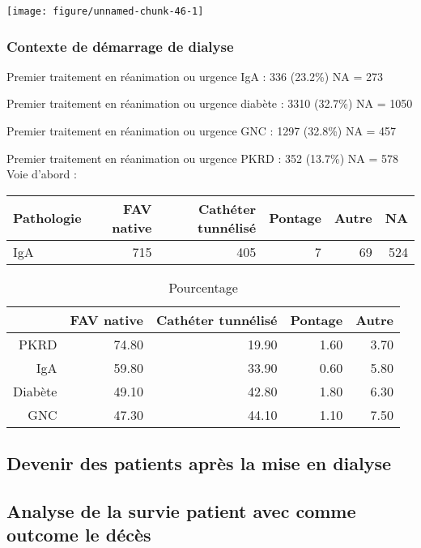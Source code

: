 \documentclass[11pt,a4paper]{article}\usepackage[]{graphicx}\usepackage[]{color}
\makeatletter
\def\maxwidth{ %
  \ifdim\Gin@nat@width>\linewidth
    \linewidth
  \else
    \Gin@nat@width
  \fi
}
\makeatother
\begin{document}
\texttt{[image: figure/unnamed-chunk-46-1]} 


    \subsubsection{Contexte de démarrage de dialyse}



    
Premier traitement en réanimation ou urgence IgA :  336 (23.2\%) NA = 273

Premier traitement en réanimation ou urgence diabète :  3310 (32.7\%) NA = 1050

Premier traitement en réanimation ou urgence GNC :  1297 (32.8\%) NA = 457

Premier traitement en réanimation ou urgence PKRD :  352 (13.7\%) NA = 578
~\\

Voie d’abord :
\begin{table}[ht]
\centering
\begin{tabular}{lrrrrr}
  \hline
Pathologie & FAV native & Cathéter tunnélisé & Pontage & Autre & NA \\ 
  \hline
IgA & 715 & 405 &   7 &  69 & 524 \\ 
   \hline
\end{tabular}
\end{table}
\begin{table}[ht]
\centering
\begin{tabular}{rrrrr}
  \hline
 & FAV native & Cathéter tunnélisé & Pontage & Autre \\ 
  \hline
PKRD & 74.80 & 19.90 & 1.60 & 3.70 \\ 
  IgA & 59.80 & 33.90 & 0.60 & 5.80 \\ 
  Diabète & 49.10 & 42.80 & 1.80 & 6.30 \\ 
  GNC & 47.30 & 44.10 & 1.10 & 7.50 \\ 
   \hline
\end{tabular}
\caption{Pourcentage} 
\end{table}


  \subsection{Devenir des patients après la mise en dialyse}
  
  \subsection{Analyse de la survie patient avec comme outcome le décès}
  
\end{document}
